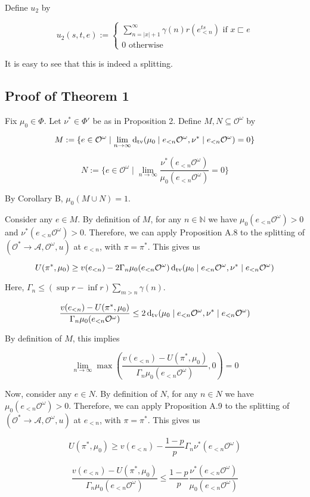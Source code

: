 \documentclass[a4paper]{article}
\newcommand{\Dtv}{\operatorname{d}_{\textnormal{tv}}}
\newcommand{\Nats}{\mathbb{N}}
\newcommand{\Abs}[1]{\lvert #1 \rvert}
\newcommand{\Act}{\mathcal{A}}
\newcommand{\Obs}{\mathcal{O}}
\newcommand{\ObsO}{\Obs^\omega}
\newcommand{\Pol}{\Obs^* \rightarrow \Act}
\begin{document}
Define ${u_2}$ by

$$u_2(s,t,e):=\begin{cases}\sum_{n = \Abs{x}+1}^{\infty} \gamma(n) r(e^{ts}_{<n}) \text{ if } x \sqsubset e\\0 \text{ otherwise}\end{cases}$$

It is easy to see that this is indeed a splitting.

\subsection{Proof of Theorem 1}

Fix ${\mu_0 \in \Phi}$. Let ${\nu^* \in \Phi'}$ be as in Proposition 2. Define ${M,N \subseteq \ObsO}$ by

$$M:=\{e \in \ObsO \mid \lim_{n \rightarrow \infty} \Dtv(\mu_0 \mid e_{<n}\ObsO, \nu^* \mid e_{<n}\ObsO) = 0\}$$

$$N:=\{e \in \ObsO \mid \lim_{n \rightarrow \infty} \frac{\nu^*(e_{<n}\ObsO)}{\mu_0(e_{<n}\ObsO)} = 0\}$$

By Corollary B, ${\mu_0(M \cup N) = 1}$.

Consider any ${e \in M}$. By definition of ${M}$, for any ${n \in \Nats}$ we have ${\mu_0(e_{<n}\ObsO) > 0}$ and ${\nu^*(e_{<n}\ObsO) > 0}$. Therefore, we can apply Proposition A.8 to the splitting of ${(\Pol,\ObsO,u)}$ at ${e_{<n}}$, with ${\pi = \pi^*}$. This gives us

$$U(\pi^*,\mu_0) \geq v(e_{<n})-2\Gamma_n \mu_0(e_{<n}\ObsO)\Dtv(\mu_0 \mid e_{<n}\ObsO, \nu^* \mid e_{<n}\ObsO)$$

Here, ${\Gamma_n \leq (\sup r - \inf r) \sum_{m > n} \gamma(n)}$. 

$$\frac{v(e_{<n}) - U(\pi^*,\mu_0)}{\Gamma_n \mu_0(e_{<n}\ObsO)} \leq 2\Dtv(\mu_0 \mid e_{<n}\ObsO, \nu^* \mid e_{<n}\ObsO)$$

By definition of ${M}$, this implies

$$\lim_{n \rightarrow \infty} \max(\frac{v(e_{<n}) - U(\pi^*,\mu_0)}{\Gamma_n \mu_0(e_{<n}\ObsO)},0) = 0 $$

Now, consider any ${e \in N}$. By definition of ${N}$, for any ${n \in N}$ we have ${\mu_0(e_{<n}\ObsO) > 0}$. Therefore, we can apply Proposition A.9 to the splitting of ${(\Pol,\ObsO,u)}$ at ${e_{<n}}$, with ${\pi = \pi^*}$. This gives us

$$U(\pi^*,\mu_0) \geq v(e_{<n})-\frac{1-p}{p} \Gamma_n \nu^*(e_{<n}\ObsO)$$

$$\frac{v(e_{<n}) - U(\pi^*,\mu_0)}{\Gamma_n\mu_0(e_{<n}\ObsO)} \leq \frac{1-p}{p} \frac{\nu^*(e_{<n}\ObsO)}{\mu_0(e_{<n}\ObsO)}$$
\end{document}
